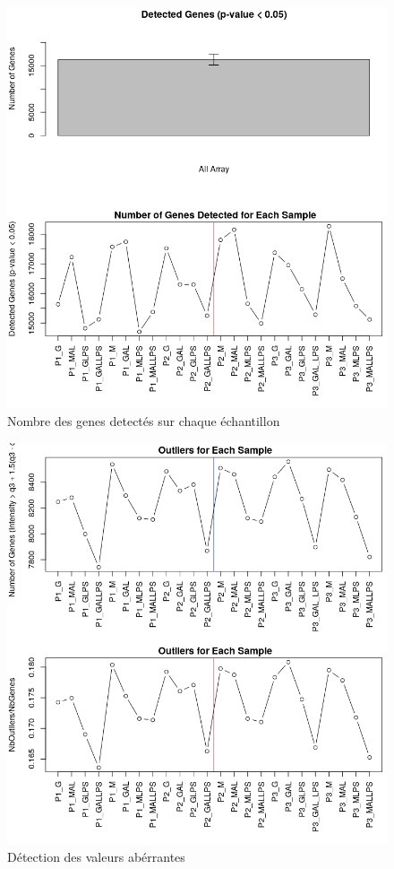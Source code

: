 \documentclass[a4paper,10pt]{article}
\begin{document}
\begin{figure}
 \centering
 \includegraphics[scale=0.5]{../../R/output/Detectedgenes.png}
 \caption{Nombre des genes detectés sur chaque échantillon}
 \label{fig:detectedGene}
\end{figure}
\begin{figure}
 \centering
 \includegraphics[scale=0.5]{../../R/output/outliers.png}
 \caption{Détection des valeurs abérrantes}
 \label{fig:outliers}
\end{figure}
\end{document}
